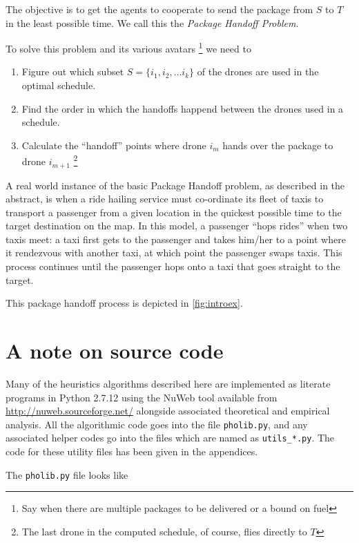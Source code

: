 \documentclass[12pt, english, oneside]{report}
\begin{document}
The objective is to get the agents to cooperate to send the package from $S$ to $T$ in the 
least possible time. We call this the \textit{Package Handoff Problem}. 

To solve this problem and its various avatars 
\footnote{Say when there are multiple packages to be delivered or a bound on fuel} 
we need to 


\begin{enumerate}
\item Figure out which subset $S = \{i_1, i_2, \ldots i_k\}$ of the drones are used in the optimal schedule. 
\item Find the order in which the handoffs happend between the drones used in a schedule. 
\item Calculate the ``handoff'' points where drone $i_m$ hands over the package to drone $i_{m+1}$ 
\footnote{The last drone in the computed schedule, of course, flies directly to $T$}
\end{enumerate}

A real world instance of the basic Package Handoff problem, as described in the abstract, is when a 
ride hailing service  must co-ordinate its fleet of taxis to transport a passenger from a given location 
in the quickest possible time to the target destination on the map. In this model, 
a passenger ``hops rides'' when two taxis meet: a taxi first gets to the passenger and takes him/her to 
a point where it rendezvous with another taxi, at which point the passenger swaps taxis. This process continues 
until the passenger hops onto a taxi that goes straight to the target.  

This package handoff process is depicted in \autoref{fig:introex}. 


\section{A note on source code}
Many of the heuristics algorithms described here are implemented as literate programs \cite{Knuth:1984:LP:473.479} 
in Python 2.7.12 using the NuWeb tool \cite{briggs1992nuweb} available from \url{http://nuweb.sourceforge.net/}
alongside associated theoretical and empirical analysis. All the algorithmic code goes into the 
file \verb|pholib.py|, and any associated helper codes go into the files which are named as \verb|utils_*.py|. 
The code for these utility files has been given in the appendices. 

The \verb|pholib.py| file looks like 
\end{document}
